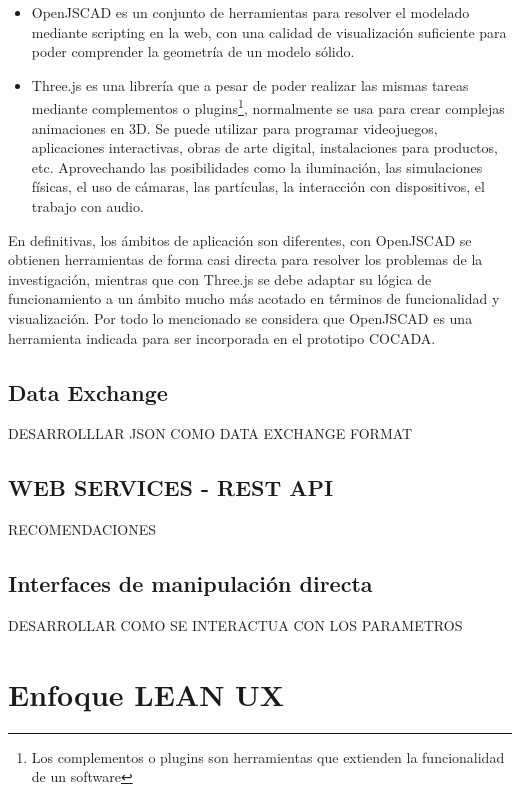 \begin{itemize}
    \item OpenJSCAD es un conjunto de herramientas para resolver el modelado mediante scripting en la web, con una calidad de visualización suficiente para poder comprender la geometría de un modelo sólido.
    \item Three.js es una librería que a pesar de poder realizar las mismas tareas mediante complementos o plugins\footnote{Los complementos o plugins son herramientas que extienden la funcionalidad de un software}, normalmente se usa para crear complejas animaciones en 3D. Se puede utilizar para programar videojuegos, aplicaciones interactivas, obras de arte digital, instalaciones para productos, etc. Aprovechando las posibilidades como la iluminación, las simulaciones físicas, el uso de cámaras, las partículas, la interacción con dispositivos, el trabajo con audio.
\end{itemize}

 En definitivas, los ámbitos de aplicación son diferentes, con OpenJSCAD se obtienen herramientas de forma casi directa para resolver los problemas de la investigación, mientras que con Three.js se debe adaptar su lógica de funcionamiento a un ámbito mucho más acotado en términos de funcionalidad y visualización. Por todo lo mencionado se considera que OpenJSCAD es una herramienta indicada para ser incorporada en el prototipo COCADA.






\subsection{Data Exchange}

DESARROLLLAR JSON COMO DATA EXCHANGE FORMAT

\subsection{WEB SERVICES - REST API}
RECOMENDACIONES

\subsection{Interfaces de manipulación directa}

DESARROLLAR COMO SE INTERACTUA CON LOS PARAMETROS

\clearpage
\section{Enfoque LEAN UX}

